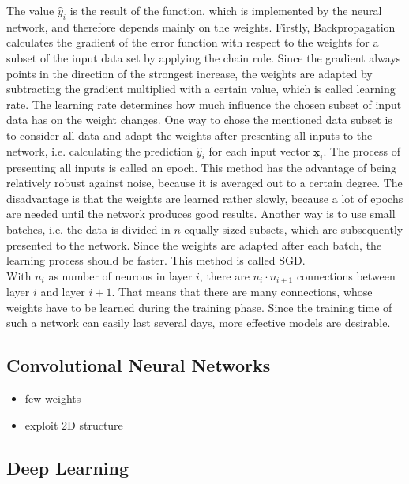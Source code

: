 \documentclass[11pt, a4paper]{article}
\newcommand\V[1]{\ensuremath{\underline{\mathbf{#1}}}}
\begin{document}
The value $\hat{y}_i$ is the result of the function, which is implemented by the neural network, and therefore depends mainly on the weights. Firstly, Backpropagation calculates the gradient of the error function with respect to the weights for a subset of the input data set by applying the chain rule. Since the gradient always points in the direction of the strongest increase, the weights are adapted by subtracting the gradient multiplied with a certain value, which is called learning rate. The learning rate determines how much influence the chosen subset of input data has on the weight changes. One way to chose the mentioned data subset is to consider all data and adapt the weights after presenting all inputs to the network, i.e. calculating the prediction $\hat{y}_i$ for each input vector $\V{x}_i$. The process of presenting all inputs is called an epoch. This method has the advantage of being relatively robust against noise, because it is averaged out to a certain degree. The disadvantage is that the weights are learned rather slowly, because a lot of epochs are needed until the network produces good results. Another way is to use small batches, i.e. the data is divided in $n$ equally sized subsets, which are subsequently presented to the network. Since the weights are adapted after each batch, the learning process should be faster. This method is called \acf{SGD}.\\
With $n_i$ as number of neurons in layer $i$, there are $n_i \cdot n_{i+1}$ connections between layer $i$ and layer $i+1$. That means that there are many connections, whose weights have to be learned during the training phase. Since the training time of such a network can easily last several days, more effective models are desirable.

\subsection{Convolutional Neural Networks}

\begin{itemize}
\item few weights
\item exploit 2D structure
\end{itemize}

\subsection{Deep Learning}
\end{document}
